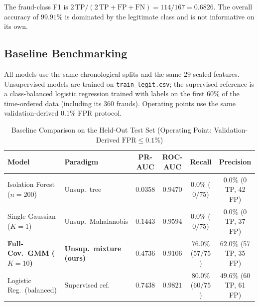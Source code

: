 \documentclass[11pt, a4paper]{article}
\begin{document}
The fraud-class F1 is $2\,\text{TP}/(2\,\text{TP}+\text{FP}+\text{FN}) = 114/167 = 0.6826$. The overall accuracy of $99.91\%$ is dominated by the legitimate class and is not informative on its own.

\subsection{Baseline Benchmarking}
\label{sec:baselines}
All models use the same chronological splits and the same $29$ scaled features. Unsupervised models are trained on \texttt{train\_legit.csv}; the supervised reference is a class-balanced logistic regression trained with labels on the first $60\%$ of the time-ordered data (including its $360$ frauds). Operating points use the same validation-derived $0.1\%$ FPR protocol.

\begin{table}[h!]
\centering
\caption{Baseline Comparison on the Held-Out Test Set (Operating Point: Validation-Derived $\text{FPR} \le 0.1\%$)}
\vspace{0.2cm}
\renewcommand{\arraystretch}{1.25}
\footnotesize
\setlength{\tabcolsep}{3pt}
\begin{tabular}{llcccc}
\toprule
\rowcolor{tableheader}
\textbf{Model} & \textbf{Paradigm} & \textbf{PR-AUC} & \textbf{ROC-AUC} & \textbf{Recall} & \textbf{Precision} \\
\midrule
Isolation Forest ($n=200$) & Unsup.\ tree & $0.0358$ & $0.9470$ & $0.0\%$ ($0/75$) & $0.0\%$ (0 TP, 42 FP) \\
\rowcolor{rowalt}
Single Gaussian ($K=1$) & Unsup.\ Mahalanobis & $0.1443$ & $0.9594$ & $0.0\%$ ($0/75$) & $0.0\%$ (0 TP, 37 FP) \\
\textbf{Full-Cov.\ GMM ($K=10$)} & \textbf{Unsup.\ mixture (ours)} & $\mathbf{0.4736}$ & $0.9106$ & $\mathbf{76.0\%}$ ($57/75$) & $\mathbf{62.0\%}$ (57 TP, 35 FP) \\
\rowcolor{rowalt}
Logistic Reg.\ (balanced) & Supervised ref. & $0.7438$ & $0.9821$ & $80.0\%$ ($60/75$) & $49.6\%$ (60 TP, 61 FP) \\
\bottomrule
\end{tabular}
\label{tab:baselines}
\end{table}
\end{document}
